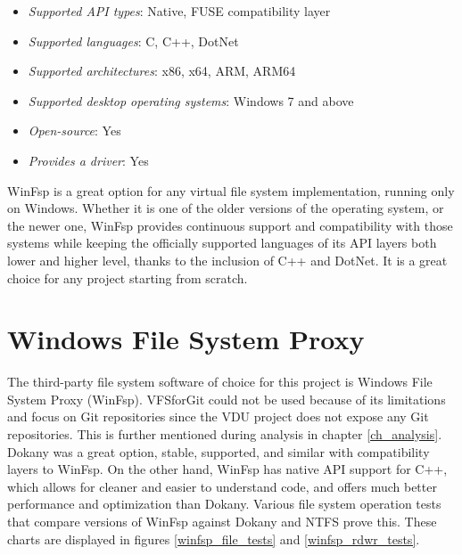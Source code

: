 \begin{itemize}
    \item \textit{Supported API types}: Native, FUSE compatibility layer
    \item \textit{Supported languages}: C, C++, DotNet
    \item \textit{Supported architectures}: x86, x64, ARM, ARM64
    \item \textit{Supported desktop operating systems}: Windows 7 and above
    \item \textit{Open-source}: Yes
    \item \textit{Provides a driver}: Yes
\end{itemize}

WinFsp is a great option for any virtual file system implementation, running only on Windows. Whether it is one of the older versions of the operating system, or the newer one, WinFsp provides continuous support and compatibility with those systems while keeping the officially supported languages of its API layers both lower and higher level, thanks to the inclusion of C++ and DotNet. It is a great choice for any project starting from scratch.\cite{GitWinFsp}

\section{Windows File System Proxy}

The third-party file system software of choice for this project is Windows File System Proxy (WinFsp). VFSforGit could not be used because of its limitations and focus on Git repositories since the VDU project does not expose any Git repositories. This is further mentioned during analysis in chapter \ref{ch_analysis}. Dokany was a great option, stable, supported, and similar with compatibility layers to WinFsp. On the other hand, WinFsp has native API support for C++, which allows for cleaner and easier to understand code, and offers much better performance and optimization than Dokany. Various file system operation tests that compare versions of WinFsp against Dokany and NTFS prove this. These charts are displayed in figures \ref{winfsp_file_tests} and \ref{winfsp_rdwr_tests}.

